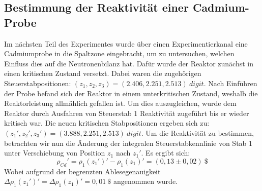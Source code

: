 	\subsection{Bestimmung der Reaktivität einer Cadmium-Probe}
	Im nächsten Teil des Experimentes wurde über einen Experimentierkanal eine Cadmiumprobe in die Spaltzone eingebracht, um zu untersuchen, welchen Einfluss dies auf die Neutronenbilanz hat. Dafür wurde der Reaktor zunächst in einen kritischen Zustand versetzt. Dabei waren die zugehörigen Steuerstabpositionen: $(z_1,z_2,z_3) = (2.406, 2.251, 2.513)\ \unit{digit}$. Nach Einführen der Probe befand sich der Reaktor in einem unterkritischen Zustand, weshalb die Reaktorleistung allmählich gefallen ist. Um dies auszugleichen, wurde dem Reaktor durch Ausfahren von Steuerstab 1 Reaktivität zugeführt bis er wieder kritisch war. Die neuen kritischen Stabpositionen ergeben sich zu:  $(z_1\prime,z_2\prime,z_3\prime) = (3.888, 2.251, 2.513)\ \unit{digit}$. Um die Reaktivität zu bestimmen, betrachten wir nun die Änderung der integralen Steuerstabkennlinie von Stab 1 unter Verschiebung von Position $z_1$ nach $z_1\prime$. Es ergibt sich: 
	$$\rho_{Cd}\prime = \rho_1(z_1\prime)\prime - \rho_1(z_1)\prime = (0,13 \pm 0,02)\ \unit{\$}$$
	Wobei aufgrund der begrenzten Ablesegenauigkeit $\Delta \rho_1(z_1\prime)\prime = \Delta \rho_1(z_1)\prime = 0,01\ \unit{\$}$ angenommen wurde.
	
